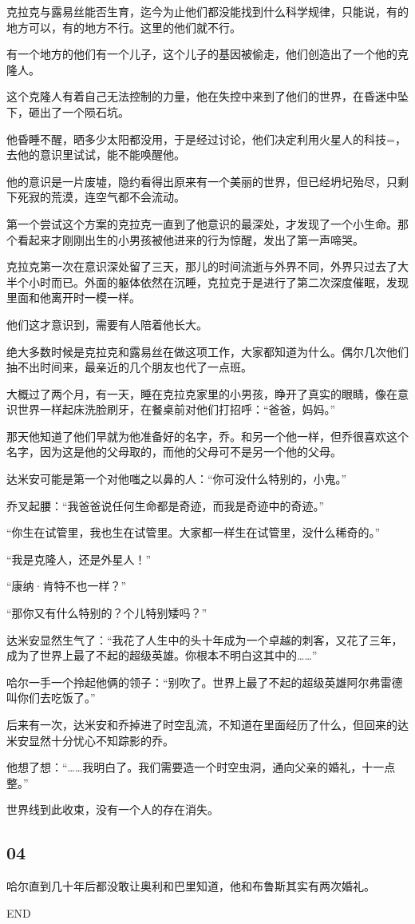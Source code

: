 \documentclass[../main]{subfiles}
\begin{document}
克拉克与露易丝能否生育，迄今为止他们都没能找到什么科学规律，只能说，有的地方可以，有的地方不行。这里的他们就不行。

有一个地方的他们有一个儿子，这个儿子的基因被偷走，他们创造出了一个他的克隆人。

这个克隆人有着自己无法控制的力量，他在失控中来到了他们的世界，在昏迷中坠下，砸出了一个陨石坑。

他昏睡不醒，晒多少太阳都没用，于是经过讨论，他们决定利用火星人的科技=，去他的意识里试试，能不能唤醒他。

他的意识是一片废墟，隐约看得出原来有一个美丽的世界，但已经坍圮殆尽，只剩下死寂的荒漠，连空气都不会流动。

第一个尝试这个方案的克拉克一直到了他意识的最深处，才发现了一个小生命。那个看起来才刚刚出生的小男孩被他进来的行为惊醒，发出了第一声啼哭。

克拉克第一次在意识深处留了三天，那儿的时间流逝与外界不同，外界只过去了大半个小时而已。外面的躯体依然在沉睡，克拉克于是进行了第二次深度催眠，发现里面和他离开时一模一样。

他们这才意识到，需要有人陪着他长大。

绝大多数时候是克拉克和露易丝在做这项工作，大家都知道为什么。偶尔几次他们抽不出时间来，最亲近的几个朋友也代了一点班。

大概过了两个月，有一天，睡在克拉克家里的小男孩，睁开了真实的眼睛，像在意识世界一样起床洗脸刷牙，在餐桌前对他们打招呼：“爸爸，妈妈。”

那天他知道了他们早就为他准备好的名字，乔。和另一个他一样，但乔很喜欢这个名字，因为这是他的父母取的，而他的父母可不是另一个他的父母。

达米安可能是第一个对他嗤之以鼻的人：“你可没什么特别的，小鬼。”

乔叉起腰：“我爸爸说任何生命都是奇迹，而我是奇迹中的奇迹。”

“你生在试管里，我也生在试管里。大家都一样生在试管里，没什么稀奇的。”

“我是克隆人，还是外星人！”

“康纳·肯特不也一样？”

“那你又有什么特别的？个儿特别矮吗？”

达米安显然生气了：“我花了人生中的头十年成为一个卓越的刺客，又花了三年，成为了世界上最了不起的超级英雄。你根本不明白这其中的\ldots\ldots”

哈尔一手一个拎起他俩的领子：“别吹了。世界上最了不起的超级英雄阿尔弗雷德叫你们去吃饭了。”

后来有一次，达米安和乔掉进了时空乱流，不知道在里面经历了什么，但回来的达米安显然十分忧心不知踪影的乔。

他想了想：“……我明白了。我们需要造一个时空虫洞，通向父亲的婚礼，十一点整。”

世界线到此收束，没有一个人的存在消失。

\hypertarget{04}{%
    \subsection{04}\label{04}}

哈尔直到几十年后都没敢让奥利和巴里知道，他和布鲁斯其实有两次婚礼。

END
\end{document}
